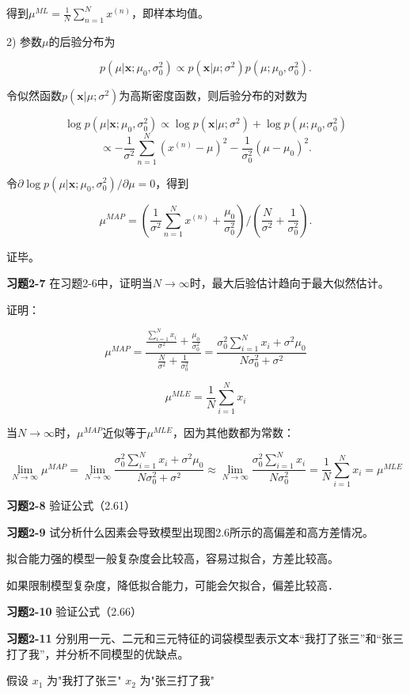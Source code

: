 得到$\mu^{ML}=\frac{1}{N}\sum_{n=1}^N x^{(n)}$，即样本均值。

2) 参数$\mu$的后验分布为

\[p(\mu|\mathbf{x};\mu_0,\sigma_0^2) \propto p(\mathbf{x}|\mu;\sigma^2)p(\mu;\mu_0,\sigma_0^2).\]

令似然函数$p(\mathbf{x}|\mu;\sigma^2)$为高斯密度函数，则后验分布的对数为

\[\log p(\mu|\mathbf{x};\mu_0,\sigma_0^2) \propto \log p(\mathbf{x}|\mu;\sigma^2)+\log p(\mu;\mu_0,\sigma_0^2)\]
\[\propto -\frac{1}{\sigma^2}\sum_{n=1}^N(x^{(n)}-\mu)^2-\frac{1}{\sigma_0^2}(\mu-\mu_0)^2.\]

令$\partial \log p(\mu|\mathbf{x};\mu_0,\sigma_0^2)/\partial \mu=0$，得到

\[\mu^{MAP}=\left(\frac{1}{\sigma^2}\sum_{n=1}^N x^{(n)}+\frac{\mu_0}{\sigma_0^2}\right)/\left(\frac{N}{\sigma^2}+\frac{1}{\sigma_0^2}\right).\]

证毕。

\noindent\textbf{习题2-7} 在习题2-6中，证明当$N \to \infty$时，最大后验估计趋向于最大似然估计。

证明：

\[\mu^{MAP} = \frac{\frac{\sum_{i=1}^N x_i}{\sigma^2} + \frac{\mu_0}{\sigma_0^2}}{\frac{N}{\sigma^2} + \frac{1}{\sigma_0^2}} = \frac{\sigma_0^2\sum_{i=1}^N x_i + \sigma^2\mu_0}{N\sigma_0^2 + \sigma^2}\]

\[\mu^{MLE} = \frac{1}{N}\sum_{i=1}^N x_i\]

当$N \to \infty$时，$\mu^{MAP}$近似等于$\mu^{MLE}$，因为其他数都为常数：

\[\lim_{N\to\infty} \mu^{MAP} = \lim_{N\to\infty} \frac{\sigma_0^2\sum_{i=1}^N x_i + \sigma^2\mu_0}{N\sigma_0^2 + \sigma^2} \approx \lim_{N\to\infty} \frac{\sigma_0^2\sum_{i=1}^N x_i}{N\sigma_0^2} = \frac{1}{N}\sum_{i=1}^N x_i = \mu^{MLE}\]

\noindent\textbf{习题2-8} 验证公式（2.61）

\noindent\textbf{习题2-9} 试分析什么因素会导致模型出现图2.6所示的高偏差和高方差情况。

拟合能力强的模型一般复杂度会比较高，容易过拟合，方差比较高。

如果限制模型复杂度，降低拟合能力，可能会欠拟合，偏差比较高．

\noindent\textbf{习题2-10} 验证公式（2.66）

\noindent\textbf{习题2-11} 分别用一元、二元和三元特征的词袋模型表示文本“我打了张三”和“张三打了我”，并分析不同模型的优缺点。

假设 $x_1$ 为"我打了张三" $x_2$ 为"张三打了我"

